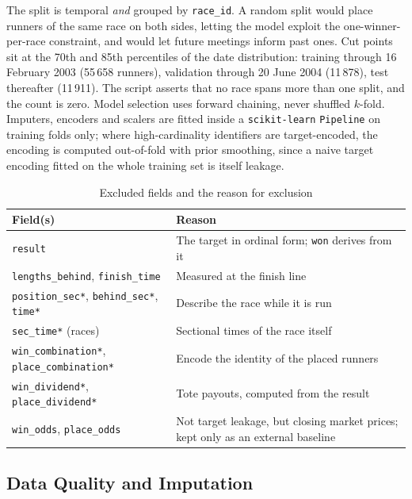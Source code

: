 The split is temporal \emph{and} grouped by \texttt{race\_id}. A random
split would place runners of the same race on both sides, letting the
model exploit the one-winner-per-race constraint, and would let future
meetings inform past ones. Cut points sit at the 70th and 85th percentiles
of the date distribution: training through 16 February 2003
(55\,658 runners), validation through 20 June 2004 (11\,878), test
thereafter (11\,911). The script asserts that no race spans more than one
split, and the count is zero. Model selection uses forward chaining, never
shuffled $k$-fold. Imputers, encoders and scalers are fitted inside a
\texttt{scikit-learn} \texttt{Pipeline} on training folds only; where
high-cardinality identifiers are target-encoded, the encoding is computed
out-of-fold with prior smoothing, since a naive target encoding fitted on
the whole training set is itself leakage.

\begin{table}[!t]
\centering
\caption{Excluded fields and the reason for exclusion}
\label{tab:leakage}
\scriptsize
\renewcommand{\arraystretch}{1.2}
\begin{tabular}{@{}p{2.5cm} p{5.1cm}@{}}
\toprule
\textbf{Field(s)} & \textbf{Reason} \\
\midrule
\texttt{result} & The target in ordinal form; \texttt{won} derives from it \\
\texttt{lengths\_behind}, \texttt{finish\_time} & Measured at the finish line \\
\texttt{position\_sec*}, \texttt{behind\_sec*}, \texttt{time*} & Describe the race while it is run \\
\texttt{sec\_time*} (races) & Sectional times of the race itself \\
\texttt{win\_combination*}, \texttt{place\_combination*} & Encode the identity of the placed runners \\
\texttt{win\_dividend*}, \texttt{place\_dividend*} & Tote payouts, computed from the result \\
\midrule
\texttt{win\_odds}, \texttt{place\_odds} & Not target leakage, but closing market prices; kept only as an external baseline \\
\bottomrule
\end{tabular}
\end{table}

\subsection{Data Quality and Imputation}
\label{sec:quality}

